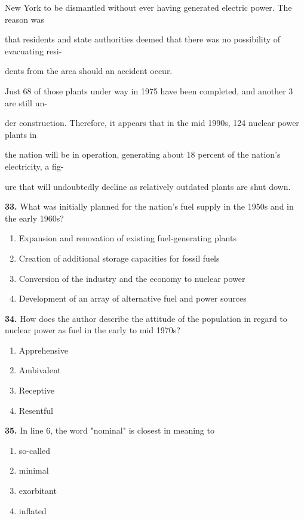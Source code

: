 \documentclass[12pt]{article}
\begin{document}
New York to be dismantled without ever having generated electric power. The reason was\par
that residents and state authorities deemed that there was no possibility of evacuating resi-\par
dents from the area should an accident occur.\par
Just 68 of those plants under way in 1975 have been completed, and another 3 are still un-\par
der construction. Therefore, it appears that in the mid 1990s, 124 nuclear power plants in\par
the nation will be in operation, generating about 18 percent of the nation's electricity, a fig-\par
ure that will undoubtedly decline as relatively outdated plants are shut down.\par
\endgroup
\medskip
\noindent\textbf{33.} What was initially planned for the nation's fuel supply in the 1950s and in the early 1960s?
\begin{enumerate}[label=(\Alph*),leftmargin=*,itemsep=0.2em]
\item Expansion and renovation of existing fuel-generating plants
\item Creation of additional storage capacities for fossil fuels
\item Conversion of the industry and the economy to nuclear power
\item Development of an array of alternative fuel and power sources
\end{enumerate}
\par
\vspace{0.25\baselineskip}
\noindent\textbf{34.} How does the author describe the attitude of the population in regard to nuclear power as fuel in the early to mid 1970s?
\begin{enumerate}[label=(\Alph*),leftmargin=*,itemsep=0.2em]
\item Apprehensive
\item Ambivalent
\item Receptive
\item Resentful
\end{enumerate}
\par
\vspace{0.25\baselineskip}
\noindent\textbf{35.} In line 6, the word "nominal" is closest in meaning to
\begin{enumerate}[label=(\Alph*),leftmargin=*,itemsep=0.2em]
\item so-called
\item minimal
\item exorbitant
\item inflated
\end{enumerate}
\end{document}

